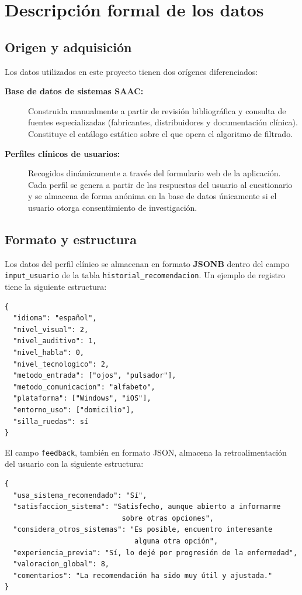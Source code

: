 
\section{Descripción formal de los datos}
\subsection{Origen y adquisición}
Los datos utilizados en este proyecto tienen dos orígenes diferenciados:

\begin{description}
	\item[\textbf{Base de datos de sistemas SAAC:}] Construida manualmente a partir de revisión bibliográfica y consulta de fuentes especializadas (fabricantes, distribuidores y documentación clínica). Constituye el catálogo estático sobre el que opera el algoritmo de filtrado.
	\item[\textbf{Perfiles clínicos de usuarios:}] Recogidos dinámicamente a través del formulario web de la aplicación. Cada perfil se genera a partir de las respuestas del usuario al cuestionario y se almacena de forma anónima en la base de datos únicamente si el usuario otorga 			consentimiento de investigación.
\end{description}

\subsection{Formato y estructura}
Los datos del perfil clínico se almacenan en formato \textbf{JSONB} dentro del campo \texttt{input\_usuario} de la tabla \texttt{historial\_recomendacion}. Un ejemplo de registro tiene la siguiente estructura:

\begin{verbatim}
{
  "idioma": "español",
  "nivel_visual": 2,
  "nivel_auditivo": 1,
  "nivel_habla": 0,
  "nivel_tecnologico": 2,
  "metodo_entrada": ["ojos", "pulsador"],
  "metodo_comunicacion": "alfabeto",
  "plataforma": ["Windows", "iOS"],
  "entorno_uso": ["domicilio"],
  "silla_ruedas": sí
}
\end{verbatim}

El campo \texttt{feedback}, también en formato JSON, almacena la retroalimentación del usuario con la siguiente estructura:

\begin{verbatim}
{
  "usa_sistema_recomendado": "Sí",
  "satisfaccion_sistema": "Satisfecho, aunque abierto a informarme 
                            sobre otras opciones",
  "considera_otros_sistemas": "Es posible, encuentro interesante 
                               alguna otra opción",
  "experiencia_previa": "Sí, lo dejé por progresión de la enfermedad",
  "valoracion_global": 8,
  "comentarios": "La recomendación ha sido muy útil y ajustada."
}
\end{verbatim}


